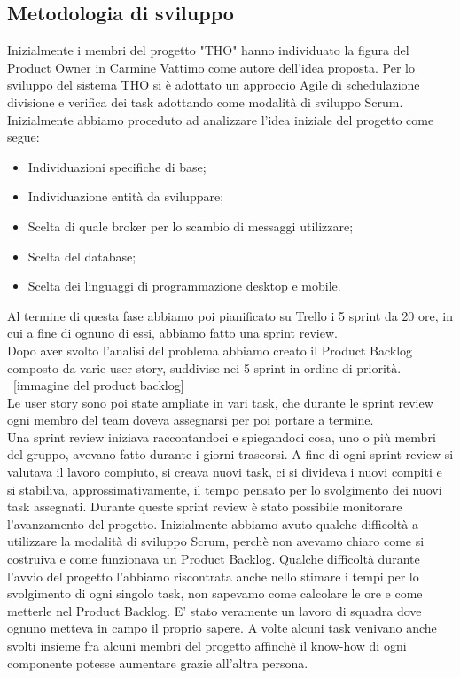 \documentclass[12pt, italian]{article}
\begin{document}
\subsection{Metodologia di sviluppo}
Inizialmente i membri del progetto "THO" hanno individuato la figura del Product Owner in Carmine Vattimo come autore dell'idea proposta. Per lo sviluppo del sistema THO si è adottato un approccio Agile di schedulazione divisione e verifica dei task adottando come modalità di sviluppo Scrum. 
\\ Inizialmente abbiamo proceduto ad analizzare l'idea iniziale del progetto come segue:
\begin{itemize}
	\item Individuazioni specifiche di base;
	\item Individuazione entità da sviluppare;
	\item Scelta di quale broker per lo scambio di messaggi utilizzare;
	\item Scelta del database;
	\item Scelta dei linguaggi di programmazione desktop e mobile.
\end{itemize}

Al termine di questa fase abbiamo poi pianificato su Trello i 5 sprint da 20 ore, in cui a fine di ognuno di essi, abbiamo fatto una sprint review.\\Dopo aver svolto l'analisi del problema abbiamo creato il Product Backlog composto da varie user story, suddivise nei 5 sprint in ordine di priorità. \\

{\ [immagine del product backlog]}\\

Le user story sono poi state ampliate in vari task, che durante le sprint review ogni membro del team doveva assegnarsi per poi portare a termine. \\Una sprint review iniziava raccontandoci e spiegandoci cosa, uno o più membri del gruppo, avevano fatto durante i giorni trascorsi. A fine di ogni sprint review si valutava il lavoro compiuto, si creava nuovi task, ci si divideva i nuovi compiti e si stabiliva, approssimativamente, il tempo pensato per lo svolgimento dei nuovi task assegnati. Durante queste sprint review è stato possibile monitorare l'avanzamento del progetto. Inizialmente abbiamo avuto qualche difficoltà a utilizzare la modalità di sviluppo Scrum, perchè non avevamo chiaro come si costruiva e come funzionava un Product Backlog. Qualche difficoltà durante l'avvio del progetto l'abbiamo riscontrata anche nello stimare i tempi per lo svolgimento di ogni singolo task, non sapevamo come calcolare le ore e come metterle nel Product Backlog. E' stato veramente un lavoro di squadra dove ognuno metteva in campo il proprio sapere. A volte alcuni task venivano anche svolti insieme fra alcuni membri del progetto affinchè il know-how di ogni componente potesse aumentare grazie all'altra persona.
\end{document}
